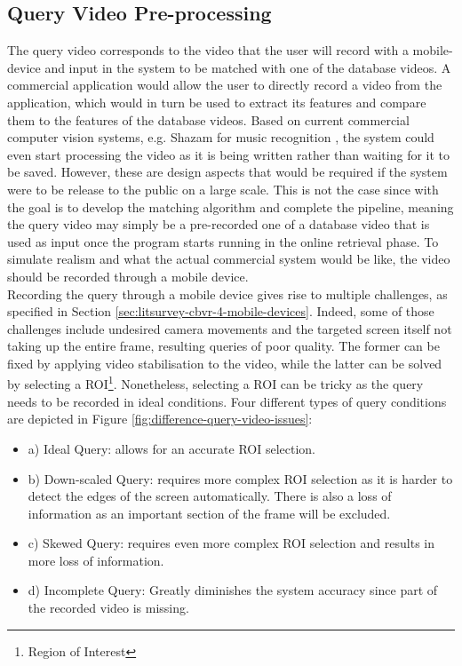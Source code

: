 \subsection{Query Video Pre-processing}

The query video corresponds to the video that the user will record with a mobile-device and input in the system to be matched with one of the database videos. A commercial application would allow the user to directly record a video from the application, which would in turn be used to extract its features and compare them to the features of the database videos. Based on current commercial computer vision systems, e.g. Shazam for music recognition \cite{shazam}, the system could even start processing the video as it is being written rather than waiting for it to be saved. However, these are design aspects that would be required if the system were to be release to the public on a large scale. This is not the case since with the goal is to develop the matching algorithm and complete the pipeline, meaning the query video may simply be a pre-recorded one of a database video that is used as input once the program starts running in the online retrieval phase. To simulate realism and what the actual commercial system would be like, the video should be recorded through a mobile device.\\

Recording the query through a mobile device gives rise to multiple challenges, as specified in Section \ref{sec:litsurvey-cbvr-4-mobile-devices}. Indeed, some of those challenges include undesired camera movements and the targeted screen itself not taking up the entire frame, resulting queries of poor quality. The former can be fixed by applying video stabilisation to the video, while the latter can be solved by selecting a ROI\footnote{Region of Interest}. Nonetheless, selecting a ROI can be tricky as the query needs to be recorded in ideal conditions. Four different types of query conditions are depicted in Figure \ref{fig:difference-query-video-issues}:
\begin{itemize}
    \item a) Ideal Query: allows for an accurate ROI selection.
    \item b) Down-scaled Query: requires more complex ROI selection as it is harder to detect the edges of the screen automatically. There is also a loss of information as an important section of the frame will be excluded.
    \item c) Skewed Query: requires even more complex ROI selection and results in more loss of information.
    \item d) Incomplete Query: Greatly diminishes the system accuracy since part of the recorded video is missing.
\end{itemize}

